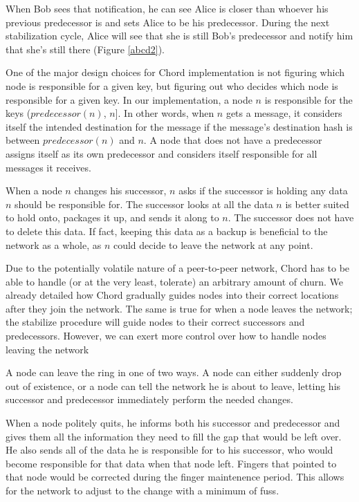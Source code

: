 \documentclass[conference, compsocconf, letterpaper]{IEEEtran}
\begin{document}
When Bob sees that notification, he can see Alice is closer than whoever his previous predecessor is and sets Alice to be his predecessor.  During the next stabilization cycle, Alice will see that she is still Bob's predecessor and notify him that she's still there (Figure \ref{abcd2}).

One of the major design choices for Chord implementation is not figuring which node is responsible for a given key, but figuring out who decides which node is responsible for a given key.  In our implementation, a node $n$ is responsible for the keys ($predecessor(n)$, $n$].  In other words, when $n$ gets a message, it considers itself the intended destination for the message if the message's destination hash is between $predecessor(n)$ and $n$.  A node that does not have a predecessor assigns itself as its own predecessor and considers itself responsible for all messages it receives. 

When a node $n$ changes his successor, $n$ asks if the successor is holding any data $n$ should be responsible for.  The successor looks at all the data $n$ is better suited to hold onto, packages it up, and sends it along to $n$.  The successor does not have to delete this data. If fact, keeping this data as a backup is beneficial to the network as a whole, as $n$ could decide to leave the network at any point. 

Due to the potentially volatile nature of a peer-to-peer network, Chord has to be able to handle (or at the very least, tolerate) an arbitrary amount of churn.  We already detailed how Chord gradually guides nodes into their correct locations after they join the network.  The same is true for when a node leaves the network; the stabilize procedure will guide nodes to their correct successors and predecessors.  However, we can exert more control over how to handle nodes leaving the network

A node can leave the ring in one of two ways.  A node can either suddenly drop out of existence, or a node can tell the network he is about to leave, letting his successor and predecessor immediately perform the needed changes.

When a node politely quits, he informs both his successor and predecessor and gives them all the information they need to fill the gap that would be left over. He also sends all of the data he is responsible for to his successor, who would become responsible for that data when that node left.  Fingers that pointed to that node would be corrected during the finger maintenence period.  This allows for the network to adjust to the change with a minimum of fuss.
\end{document}
